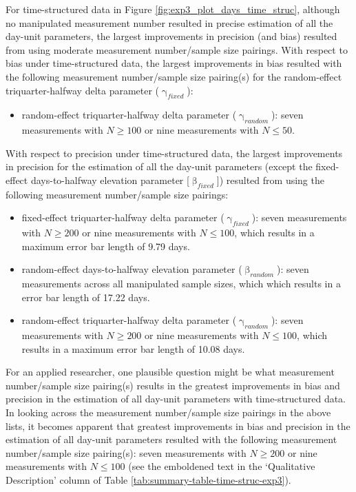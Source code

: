 \documentclass[
12pt, %
twoside,
english]{guelphthesis}
\begin{document}
For time-structured data in Figure \ref{fig:exp3_plot_days_time_struc}, although no manipulated measurement number resulted in precise estimation of all the day-unit parameters, the largest improvements in precision (and bias) resulted from using moderate measurement number/sample size pairings. With respect to bias under time-structured data, the largest improvements in bias resulted with the following measurement number/sample size pairing(s) for the random-effect triquarter-halfway delta parameter (\(\upgamma_{fixed}\)):
\begin{itemize}
\tightlist
\item
  random-effect triquarter-halfway delta parameter (\(\upgamma_{random}\)): seven measurements with \(N \ge 100\) or nine measurements with \(N \le 50\).
\end{itemize}
\noindent With respect to precision under time-structured data, the largest improvements in precision for the estimation of all the day-unit parameters (except the fixed-effect days-to-halfway elevation parameter {[}\(\upbeta_{fixed}\){]}) resulted from using the following measurement number/sample size pairings:
\begin{itemize}
\tightlist
\item
  fixed-effect triquarter-halfway delta parameter (\(\upgamma_{fixed}\)): seven measurements with \(N \ge 200\) or nine measurements with \(N \le 100\), which results in a maximum error bar length of 9.79 days.
\item
  random-effect days-to-halfway elevation parameter (\(\upbeta_{random}\)): seven measurements across all manipulated sample sizes, which which results in a error bar length of 17.22 days.
\item
  random-effect triquarter-halfway delta parameter (\(\upgamma_{random}\)): seven measurements with \(N \ge 200\) or nine measurements with \(N \le 100\), which results in a maximum error bar length of 10.08 days.
\end{itemize}
For an applied researcher, one plausible question might be what measurement number/sample size pairing(s) results in the greatest improvements in bias and precision in the estimation of all day-unit parameters with time-structured data. In looking across the measurement number/sample size pairings in the above lists, it becomes apparent that greatest improvements in bias and precision in the estimation of all day-unit parameters resulted with the following measurement number/sample size pairing(s): seven measurements with \(N \ge 200\) or nine measurements with \(N \le 100\) (see the emboldened text in the `Qualitative Description' column of Table \ref{tab:summary-table-time-struc-exp3}).
\end{document}
